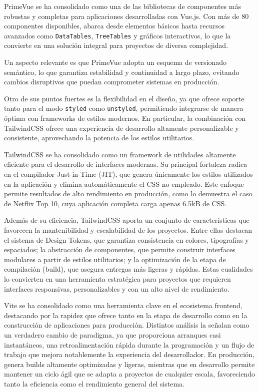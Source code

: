 PrimeVue se ha consolidado como una de las bibliotecas de componentes más robustas y completas para aplicaciones desarrolladas con Vue.js. Con más de 80 componentes disponibles, abarca desde elementos básicos hasta recursos avanzados como \texttt{DataTables}, \texttt{TreeTables} y gráficos interactivos, lo que la convierte en una solución integral para proyectos de diversa complejidad.~\cite{primevue_intro}

Un aspecto relevante es que PrimeVue adopta un esquema de versionado semántico, lo que garantiza estabilidad y continuidad a largo plazo, evitando cambios disruptivos que puedan comprometer sistemas en producción.~\cite{mobilereality_vue_libs}

Otro de sus puntos fuertes es la flexibilidad en el diseño, ya que ofrece soporte tanto para el modo \texttt{styled} como \texttt{unstyled}, permitiendo integrarse de manera óptima con frameworks de estilos modernos. En particular, la combinación con TailwindCSS ofrece una experiencia de desarrollo altamente personalizable y consistente, aprovechando la potencia de los estilos utilitarios.~\cite{primevue_tailwind}

TailwindCSS se ha consolidado como un framework de utilidades altamente eficiente para el desarrollo de interfaces modernas. Su principal fortaleza radica en el compilador Just-in-Time (JIT), que genera únicamente los estilos utilizados en la aplicación y elimina automáticamente el CSS no empleado. Este enfoque permite resultados de alto rendimiento en producción, como lo demuestra el caso de Netflix Top 10, cuya aplicación completa carga apenas 6.5kB de CSS.~\cite{tailwind_prod}

Además de su eficiencia, TailwindCSS aporta un conjunto de características que favorecen la mantenibilidad y escalabilidad de los proyectos. Entre ellas destacan el sistema de Design Tokens, que garantiza consistencia en colores, tipografías y espaciados; la abstracción de componentes, que permite construir interfaces modulares a partir de estilos utilitarios; y la optimización de la etapa de compilación (build), que asegura entregas más ligeras y rápidas. Estas cualidades lo convierten en una herramienta estratégica para proyectos que requieren interfaces responsivas, personalizables y con un alto nivel de rendimiento.~\cite{scriptbinary_tailwind}

Vite se ha consolidado como una herramienta clave en el ecosistema frontend, destacando por la rapidez que ofrece tanto en la etapa de desarrollo como en la construcción de aplicaciones para producción. Distintos análisis la señalan como un verdadero cambio de paradigma, ya que proporciona arranques casi instantáneos, una retroalimentación rápida durante la programación y un flujo de trabajo que mejora notablemente la experiencia del desarrollador. En producción, genera builds altamente optimizadas y ligeras, mientras que en desarrollo permite mantener un ciclo ágil que se adapta a proyectos de cualquier escala, favoreciendo tanto la eficiencia como el rendimiento general del sistema.~\cite{syncfusion_vite}~\cite{devto_vite_vs_webpack}

